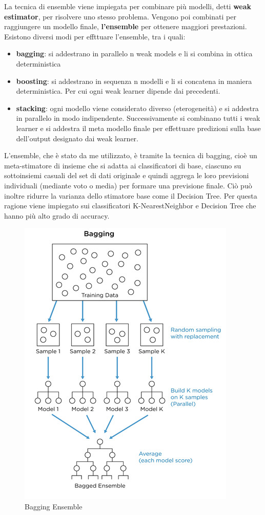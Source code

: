 La tecnica di ensemble viene impiegata per combinare più modelli, detti \textbf{weak estimator}, per risolvere uno stesso problema. Vengono poi combinati per raggiungere un modello finale, \textbf{l'ensemble} per ottenere maggiori prestazioni. 
\newline Esistono diversi modi per effttuare l'ensemble, tra i quali:
\begin{itemize}
    \item \textbf{bagging}: si addestrano in parallelo n weak models e li si combina in ottica deterministica
    \item \textbf{boosting}: si addestrano in sequenza n modelli e li si concatena in maniera deterministica. Per cui ogni weak learner dipende dai precedenti.
    \item \textbf{stacking}: ogni modello viene considerato diverso (eterogeneità) e si addestra in parallelo in modo indipendente. Successivamente si combinano tutti i weak learner e si addestra il meta modello finale per effettuare predizioni sulla base dell'output designato dai weak learner.
\end{itemize}
L'ensemble, che è stato da me utilizzato, è tramite la tecnica di bagging, cioè un meta-stimatore di insieme che si adatta ai classificatori di base, ciascuno su sottoinsiemi casuali del set di dati originale e quindi aggrega le loro previsioni individuali (mediante voto o media) per formare una previsione finale. Ciò può inoltre ridurre la varianza dello stimatore base come il Decision Tree. Per questa ragione viene impiegato sui classificatori K-NearestNeighbor e Decision Tree che hanno più alto grado di accuracy.

\begin{figure}[H]
    \centering
    \includegraphics[width=0.35\columnwidth]{figures/Bagging_Ensemble.jpg}
    \caption{Bagging Ensemble}
    \label{fig:target}
\end{figure}